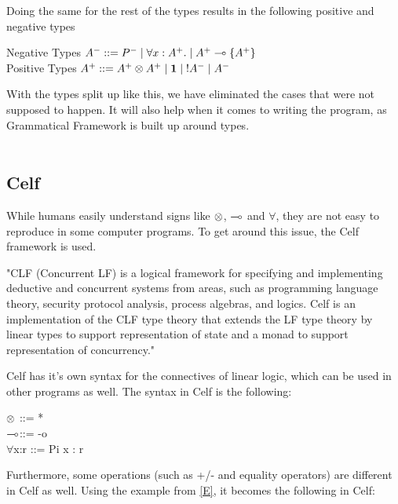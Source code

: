 Doing the same for the rest of the types results in the following positive and negative types
\begin{texto}
Negative Types $A^- ::= P^- \; | \; \forall x:A^+. \; | \; A^+ \multimap \{ A^+ \}$\\
Positive Types \hspace{0.8pt} $A^+ ::= A^+ \otimes A^+ \; | \; \mathord{\text{\rm\bf 1}} \; | \; \mathord{\text{\rm !}} A^- \; | \; A^-$
\end{texto}
With the types split up like this, we have eliminated the cases that were not supposed to happen. It will also help when it comes to writing the program, as Grammatical Framework is built up around types.
\\ 
\\ 

\subsection{Celf}
\label{LL_03}

While humans easily understand signs like $\otimes$, $\multimap$ and $\forall$, they are not easy to reproduce in some computer programs. To get around this issue, the Celf framework is used. 

"CLF (Concurrent LF) is a logical framework for specifying and implementing deductive and concurrent systems from areas, such as programming language theory, security protocol analysis, process algebras, and logics. Celf is an implementation of the CLF type theory that extends the LF type theory by linear types to support representation of state and a monad to support representation of concurrency."\cite{Celf}

Celf has it's own syntax for the connectives of linear logic, which can be used in other programs as well. The syntax in Celf is the following:
\begin{texto}
	$\otimes$\hspace{10pt} ::= * \\
	$\multimap$\hspace{10pt}::= -o \\
	$\forall$x:r ::= Pi x : r
\end{texto}
Furthermore, some operations (such as +/- and equality operators) are different in Celf as well. Using the example from \ref{E}, it becomes the following in Celf:
\begin{texto}

\end{texto}
